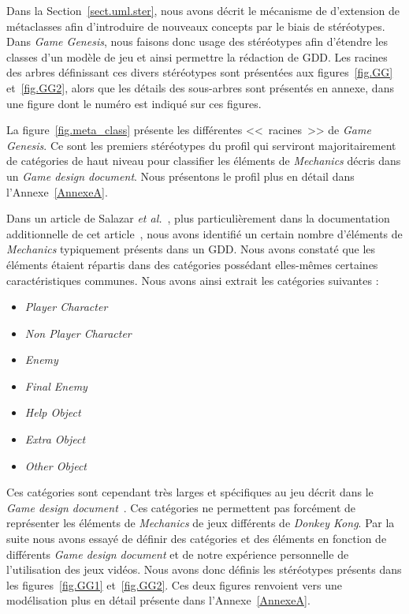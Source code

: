 Dans la Section~\ref{sect.uml.ster}, nous avons décrit le mécanisme de d'extension de m\'etaclasses afin d'introduire de nouveaux concepts par le biais de stéréotypes. 
Dans \emph{Game Genesis}, nous faisons donc usage des stéréotypes afin d'étendre les classes d'un modèle de jeu et ainsi permettre la rédaction de GDD.
%
Les racines des arbres définissant ces divers stéréotypes sont
présentées aux figures~\ref{fig.GG} et~\ref{fig.GG2}, alors que les
détails des sous-arbres sont présentés en annexe, dans une figure
dont le numéro est indiqué sur ces figures.

La figure~\ref{fig.meta_class} présente les différentes <<~racines~>> de \emph{Game Genesis}. 
Ce sont les premiers stéréotypes du profil qui serviront majoritairement de catégories de haut niveau pour classifier les éléments de \emph{Mechanics} décris dans un \emph{Game design document}.
Nous présentons le profil plus en détail dans l'Annexe~\ref{AnnexeA}.



Dans un article de Salazar \emph{et al.}~\cite{GDD_software}, plus particulièrement dans la documentation additionnelle de cet article~\cite{salazar_gdd}, nous avons identifié un certain nombre d'\'el\'ements de \emph{Mechanics} typiquement présents dans un GDD.
Nous avons constaté que les éléments étaient répartis dans des catégories possédant elles-mêmes certaines caractéristiques communes. 
Nous avons ainsi extrait les catégories suivantes :

\begin{itemize}
    \item \emph{Player Character}
    \item \emph{Non Player Character}
    \item \emph{Enemy}
    \item \emph{Final Enemy}
    \item \emph{Help Object}
    \item \emph{Extra Object}
    \item \emph{Other Object}
\end{itemize}

Ces catégories sont cependant très larges et spécifiques au jeu décrit dans le \emph{Game design document}~\cite{salazar_gdd}.
Ces catégories ne permettent pas forcément de représenter les éléments de \emph{Mechanics} de jeux différents de \emph{Donkey Kong}.
Par la suite nous avons essayé de définir des catégories et des éléments en fonction de différents \emph{Game design document} et de notre expérience personnelle de l'utilisation des jeux vidéos.
Nous avons donc définis les stéréotypes présents dans les figures~\ref{fig.GG1} et~\ref{fig.GG2}.
Ces deux figures renvoient vers une modélisation plus en détail présente dans l'Annexe~\ref{AnnexeA}.

